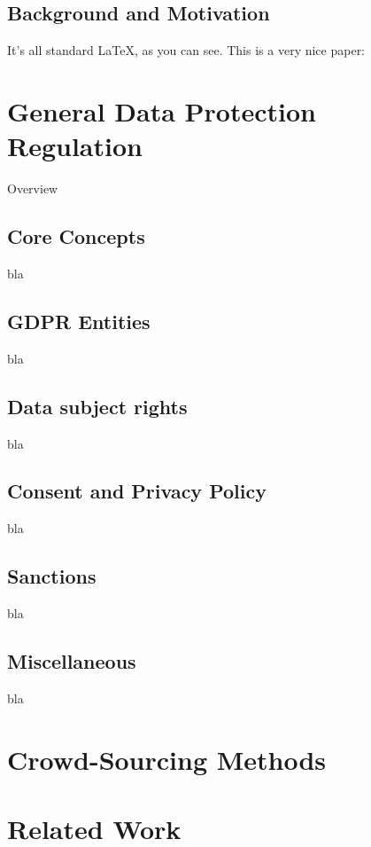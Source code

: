 \documentclass[a4paper,12pt]{report}
\begin{document}
		\section{Background and Motivation}
		\startsection
			It's all standard \LaTeX, as you can see. This is a very nice paper: \cite{NokiaWisdomOfTheCrowds} \cite{NokiaAVACrowdAnalytics} \cite{SmartIdeasForSmartCities} \cite{CrowdPoweredSmartCities} \cite{MakingCitiesSmarter} \cite{WisdomOfStakeholders} \cite{CrowdSourcing} \cite{MobileCrowdSourcing} \cite{SmartCityJeddah} \cite{NextWaveOfInnovation} \cite{zadeh} \cite{LanierWeylBlueprint} \cite{LanierWeylNYTOpinion}
		\closesection
		
	\chapter{General Data Protection Regulation}
	\startsection
	Overview
	\section{Core Concepts}
	\startsection
	bla
	\closesection

	\section{GDPR Entities}
	\startsection
	bla
	\closesection

	\section{Data subject rights}
	\startsection
	bla
	\closesection

	\section{Consent and Privacy Policy}
	\startsection
	bla
	\closesection

	\section{Sanctions}
	\startsection
	bla
	\closesection

	\section{Miscellaneous}
	\startsection
	bla
	\closesection

	\closesection
	
	\chapter{Crowd-Sourcing Methods}
	\startsection
	\closesection
	
	\chapter{Related Work \cite{LanierWeylBlueprint}}
	\startsection
	\closesection


	\newpage
	
		
\end{document}
